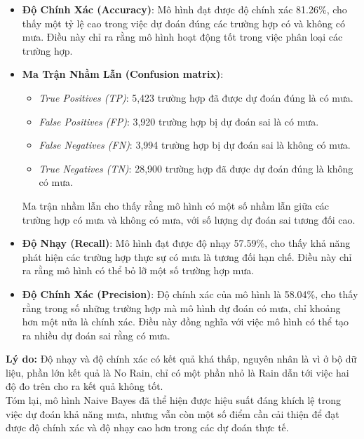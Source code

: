 \documentclass[conference]{IEEEtran}
\begin{document}
\begin{itemize}
    \item \textbf{Độ Chính Xác (Accuracy)}: Mô hình đạt được độ chính xác 81.26\%, cho thấy một tỷ lệ cao trong việc dự đoán đúng các trường hợp có và không có mưa. Điều này chỉ ra rằng mô hình hoạt động tốt trong việc phân loại các trường hợp.
    
    \item \textbf{Ma Trận Nhầm Lẫn (Confusion matrix)}:
    \begin{itemize}
        \item \textit{True Positives (TP)}: 5,423 trường hợp đã được dự đoán đúng là có mưa.
        \item \textit{False Positives (FP)}: 3,920 trường hợp bị dự đoán sai là có mưa.
        \item \textit{False Negatives (FN)}: 3,994 trường hợp bị dự đoán sai là không có mưa.
        \item \textit{True Negatives (TN)}: 28,900 trường hợp đã được dự đoán đúng là không có mưa.
    \end{itemize}
    Ma trận nhầm lẫn cho thấy rằng mô hình có một số nhầm lẫn giữa các trường hợp có mưa và không có mưa, với số lượng dự đoán sai tương đối cao.

    \item \textbf{Độ Nhạy (Recall)}: Mô hình đạt được độ nhạy 57.59\%, cho thấy khả năng phát hiện các trường hợp thực sự có mưa là tương đối hạn chế. Điều này chỉ ra rằng mô hình có thể bỏ lỡ một số trường hợp mưa.
    
    \item \textbf{Độ Chính Xác (Precision)}: Độ chính xác của mô hình là 58.04\%, cho thấy rằng trong số những trường hợp mà mô hình dự đoán có mưa, chỉ khoảng hơn một nửa là chính xác. Điều này đồng nghĩa với việc mô hình có thể tạo ra nhiều dự đoán sai rằng có mưa.
\end{itemize}

\noindent \textbf{Lý do:} Độ nhạy và độ chính xác có kết quả khá thấp, nguyên nhân là vì ở bộ dữ liệu, phần lớn kết quả là No Rain, chỉ có một phần nhỏ là Rain dẫn tới việc hai độ đo trên cho ra kết quả không tốt.
\\
\indent Tóm lại, mô hình Naive Bayes đã thể hiện được hiệu suất đáng khích lệ trong việc dự đoán khả năng mưa, nhưng vẫn còn một số điểm cần cải thiện để đạt được độ chính xác và độ nhạy cao hơn trong các dự đoán thực tế.
\end{document}
